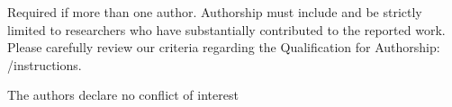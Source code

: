 \documentclass[sensors,article,submit,moreauthors,pdftex,12pt,a4paper]{mdpi}
\begin{document}










Required if more than one author. Authorship must include and be strictly limited to researchers who have substantially contributed to the reported work. Please carefully review our criteria regarding the Qualification for Authorship: \web /instructions.



The authors declare no conflict of interest

% 







% 



%


%
\end{document}
